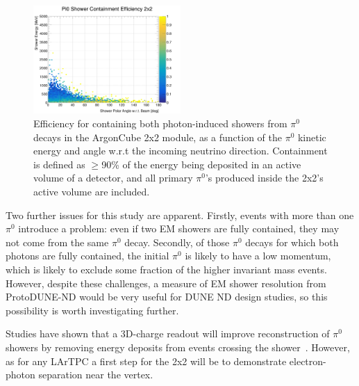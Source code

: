 \begin{figure}[htb]
  \centering
  \includegraphics[width=0.5\textwidth]{plots/2x2_minerva_plots/Pi0_cont_eff_2x2.png}
  \caption{Efficiency for containing both photon-induced showers from $\pi^{0}$ decays in the ArgonCube 2x2 module, as a function of the $\pi^{0}$ kinetic energy and angle w.r.t the incoming neutrino direction. Containment is defined as $\geq$90\% of the energy being deposited in an active volume of a detector, and all primary $\pi^{0}$'s produced inside the 2x2's active volume are included.}
  \label{fig:pi0_containment_2x2}
\end{figure}
Two further issues for this study are apparent. Firstly, events with more than one $\pi^{0}$ introduce a problem: even if two EM showers are fully contained, they may not come from the same $\pi^{0}$ decay. Secondly, of those $\pi^{0}$ decays for which both photons are fully contained, the initial $\pi^{0}$ is likely to have a low momentum, which is likely to exclude some fraction of the higher invariant mass events. However, despite these challenges, a measure of EM shower resolution from ProtoDUNE-ND would be very useful for DUNE ND design studies, so this possibility is worth investigating further.

Studies have shown that a 3D-charge readout will improve reconstruction of $\pi^{0}$ showers by removing energy deposits from events crossing the shower~\cite{Damian}. However, as for any LArTPC a first step for the 2x2 will be to demonstrate electron-photon separation near the vertex.    


\FloatBarrier
